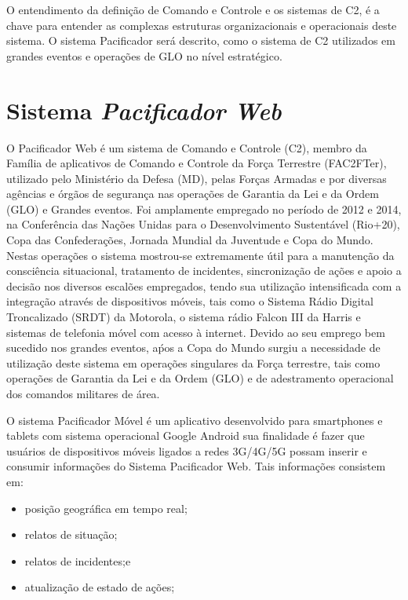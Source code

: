 \hspace{1.5cm}
O entendimento da definição de Comando e Controle e os sistemas de C2, é a chave para entender as complexas estruturas organizacionais e operacionais deste sistema. O sistema Pacificador será descrito, como o sistema de C2 utilizados em grandes eventos e operações de GLO no nível estratégico. 

\section*{Sistema \textbf{\textit{Pacificador Web}}}

\hspace{1.5cm}
O Pacificador Web é um sistema de Comando e Controle (C2), membro da Família de aplicativos de Comando e Controle da Força Terrestre (FAC2FTer), utilizado pelo Ministério da Defesa (MD), pelas Forças Armadas e por diversas agências e órgãos de segurança nas operações de Garantia da Lei e da Ordem (GLO) e Grandes eventos. Foi amplamente empregado no período de 2012 e 2014, na Conferência das Nações Unidas para o Desenvolvimento Sustentável (Rio+20), Copa das Confederações, Jornada Mundial da Juventude e Copa do Mundo. Nestas operações o sistema mostrou-se extremamente útil para a manutenção da consciência situacional, tratamento de incidentes, sincronização de ações e apoio a decisão nos diversos escalões empregados, tendo sua utilização intensificada com a integração através de dispositivos móveis, tais como o Sistema Rádio Digital Troncalizado (SRDT) da Motorola, o sistema rádio Falcon III da Harris e sistemas de telefonia móvel com acesso à internet. Devido ao seu emprego bem sucedido nos grandes eventos, aṕos a Copa do Mundo surgiu a necessidade de utilização deste sistema em operações singulares da Força terrestre, tais como operações de Garantia da Lei e da Ordem (GLO) e de adestramento operacional dos comandos militares de área. 

\hspace{1.5cm}
O sistema Pacificador Móvel é um aplicativo desenvolvido para smartphones e tablets com sistema operacional Google Android sua finalidade é fazer que usuários de dispositivos móveis ligados a redes 3G/4G/5G possam inserir e consumir informações do Sistema Pacificador Web.
\indent Tais informações consistem em:
\begin{itemize}
 \item posição geográfica em tempo real;
 \item relatos de situação;
 \item relatos de incidentes;e
 \item atualização de estado de ações;
\end{itemize}

